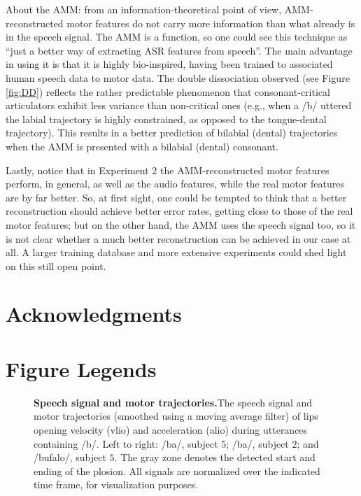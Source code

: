 \documentclass[10pt]{article}
\newcommand{\vlio}{\textsf{vlio}}
\newcommand{\alio}{\textsf{alio}}
\begin{document}
About the AMM: from an information-theoretical point of view, AMM-reconstructed
motor features do not carry more information than what already is in the speech signal.
The AMM is a function, so one could see this technique as
``just a better way of extracting ASR features from speech''.
The main advantage in using it is that it is highly bio-inspired,
having been trained to associated human speech data to motor data. The double dissociation
observed (see Figure \ref{fig:DD}) reflects the rather predictable phenomenon
that consonant-critical articulators exhibit less variance than non-critical ones (e.g.,
when a /b/ uttered the labial trajectory is highly constrained, as opposed to the tongue-dental
trajectory). This results in a better prediction of bilabial (dental) trajectories when the
AMM is presented with a bilabial (dental) consonant.

Lastly, notice that in Experiment 2 the AMM-reconstructed motor features perform, in general,
as well as the audio features, while the real motor features are by far better. So, at first
sight, one could be tempted to think that a better reconstruction should achieve better error
rates, getting close to those of the real motor features;
but on the other hand, the AMM uses the speech signal too, so it is not clear
whether a much better reconstruction can be achieved in our case at all. A larger training
database and more extensive experiments could shed light on this still open point.




\section*{Acknowledgments}




\section*{Figure Legends}


\begin{figure}[ht]
\begin{center}
\end{center}
\caption{{\bf Speech signal and motor trajectories.}The speech signal and motor trajectories 
(smoothed using a moving average filter) of lips opening
velocity (\vlio) and acceleration (\alio) during utterances containing /b/.
Left to right: /ba/, subject $5$; /ba/, subject $2$; and /bufalo/, subject $5$.
The gray zone denotes the detected start and ending of the plosion. All signals
are normalized over the indicated time frame, for visualization purposes.}
\label{fig:isdView}
\end{figure}
\end{document}
